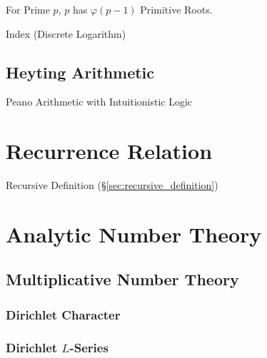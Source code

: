 For Prime $p$, $p$ has $\varphi(p-1)$ Primitive Roots.

Index (Discrete Logarithm) %



\subsection{Heyting Arithmetic}\label{sec:heyting_arithmetic}

Peano Arithmetic with Intuitionistic Logic



\section{Recurrence Relation}\label{sec:recurrence_relation}

Recursive Definition (\S\ref{sec:recursive_definition})



\section{Analytic Number Theory}\label{sec:analytic_number_theory}

\subsection{Multiplicative Number Theory}
\label{sec:multiplicative_number_theory}

\subsubsection{Dirichlet Character}\label{sec:dirichlet_character}

\subsubsection{Dirichlet $L$-Series}\label{sec:l_series}

